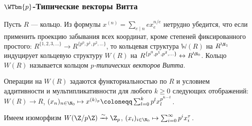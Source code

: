 \documentclass[
	extrafontsizes,
	11pt,
	hyphens,
]{memoir}
\begin{document}

\subsubsection{\texorpdfstring{\(\WTbm{p}\)-Типические}{p-Типические} векторы Витта}

\begin{definition}
Пусть \(R\) --- кольцо. Из формулы
\(x^{(n)} = \textstyle\sum_{e \mid n} e x_e^{n/e}\)
нетрудно убедится, что если применить проекцию забывания всех координат, кроме степеней фиксированного простого:
\(
R^{\{1,2,3,\dots{}\}}
\to
R^{\{p^0,p^1,p^2,\dots{}\}}
\),
то кольцевая структура \(\mathbb{W}(R)\) на \(R^{\N_1}\) индуцирует кольцевую структуру \(W(R)\) на \(R^{\{p^0,p^1,p^2,\dots{}\}} \leftrightarrow R^{\N_0}\). Кольцо \(W(R)\) называется кольцом \emph{\(p\)-типических векторов Витта}.
\end{definition}

\begin{remark}
Операции на \(W(R)\) задаются функториальностью по \(R\) и условием аддитивности и мультипликативности для любого \(k \geq 0\) следующих отображений:
\(
W(R) \to R
\),
\(
(x_n)_{n \in \N_0}
\mapsto
x^{(k)_p} \coloneqq
\sum_{l=0}^k p^l x_l^{p^{k-l}}
\).
\end{remark}

\begin{remark}
Имеем изоморфизм
\(W(\Z/p\Z) \xrightarrow{\sim} \Z_p\),
\((x_i)_{i \in \N_0} \mapsto \sum_{i=0}^\infty p^i x_i^\tau\).
\end{remark}


%
\end{document}
